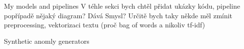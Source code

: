 \chap My models and pipelines
V téhle sekci bych chtěl přidat ukázky kódu, pipeline popřípadě nějaký diagram? Dává Smysl?
Určitě bych taky někde měl zmínit preprocessing, vektorizaci textu (proč bag of words a nikoliv tf-idf)

\sec Synthetic anomly generators
